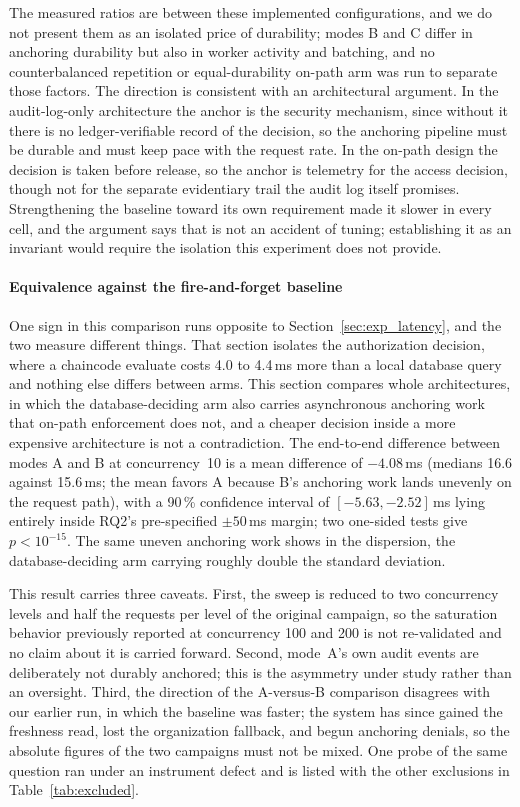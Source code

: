 \documentclass[preprint,12pt]{elsarticle}
\begin{document}
The measured ratios are between these implemented configurations, and we do
not present them as an isolated price of durability; modes B and C differ in
anchoring durability but also in worker activity and batching, and no
counterbalanced repetition or equal-durability on-path arm was run to separate
those factors. The direction is consistent with an architectural argument. In the audit-log-only architecture the anchor is the security
mechanism, since without it there is no ledger-verifiable record of the
decision, so the anchoring pipeline must be durable and must keep pace with
the request rate. In the on-path design the decision is taken before release,
so the anchor is telemetry for the access decision, though not for the
separate evidentiary trail the audit log itself promises. Strengthening the
baseline toward its own requirement made it slower in every cell, and the
argument says that is not an accident of tuning; establishing it as an
invariant would require the isolation this experiment does not provide.

\paragraph{Equivalence against the fire-and-forget baseline}
One sign in this comparison runs opposite to Section~\ref{sec:exp_latency},
and the two measure different things. That section isolates the authorization
decision, where a chaincode evaluate costs 4.0 to 4.4\,ms more than a local
database query and nothing else differs between arms. This section compares
whole architectures, in which the database-deciding arm also carries
asynchronous anchoring work that on-path enforcement does not, and a cheaper
decision inside a more expensive architecture is not a contradiction. The end-to-end difference between modes A and B at
concurrency~10 is a mean difference of $-4.08$\,ms (medians 16.6 against
15.6\,ms; the mean favors A because B's anchoring work lands unevenly on the
request path), with a 90\,\% confidence interval of
$[-5.63, -2.52]$\,ms lying entirely inside RQ2's pre-specified $\pm 50$\,ms
margin; two one-sided tests give $p < 10^{-15}$. The same uneven anchoring work
shows in the dispersion, the database-deciding arm carrying roughly double the
standard deviation.

This result carries three caveats. First, the sweep is reduced to two
concurrency levels and half the requests per level of the original campaign,
so the saturation behavior previously reported at concurrency 100 and 200 is
not re-validated and no claim about it is carried forward. Second, mode~A's
own audit events are deliberately not durably anchored; this is the asymmetry
under study rather than an oversight. Third, the direction of the A-versus-B
comparison disagrees with our earlier run, in which the baseline was faster;
the system has since gained the freshness read, lost the organization
fallback, and begun anchoring denials, so the absolute figures of the two
campaigns must not be mixed. One probe of the same question ran under an
instrument defect and is listed with the other exclusions in
Table~\ref{tab:excluded}.
\end{document}
